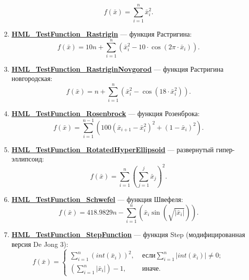 \begin{enumerate}
 \begin{equation}
 f\left( \bar{x}\right) = \sum_{i=1}^{n}\bar{x}_i^2.
 \end{equation}
 \item \hyperref[TestFunctions:section:HML_TestFunction_Rastrigin]{\textbf{HML\_TestFunction\_Rastrigin}} --- функция Растригина:
 \begin{equation}
 f\left( \bar{x}\right) = 10n+\sum_{i=1}^{n}\left( \bar{x}_i^2-10\cdot\cos\left( 2\pi\cdot \bar{x}_i\right) \right).
 \end{equation}
 \item \hyperref[TestFunctions:section:HML_TestFunction_RastriginNovgorod]{\textbf{HML\_TestFunction\_RastriginNovgorod}} --- функция Растригина новгородская:
 \begin{equation}
 f\left( \bar{x}\right) = n+\sum_{i=1}^{n}\left( \bar{x}_i^2-\cos\left(18\cdot \bar{x}_i^2\right) \right).
 \end{equation}
 \item \hyperref[TestFunctions:section:HML_TestFunction_Rosenbrock]{\textbf{HML\_TestFunction\_Rosenbrock}} --- функция Розенброка:
 \begin{equation}
 f\left( \bar{x}\right) = \sum_{i=1}^{n-1} \left( 100{\left( \bar{x}_{i+1}-\bar{x}_i^2\right)}^2+{\left( 1-\bar{x}_i\right) }^2 \right).
 \end{equation}
 \item \hyperref[TestFunctions:section:HML_TestFunction_RotatedHyperEllipsoid]{\textbf{HML\_TestFunction\_RotatedHyperEllipsoid}} --- развернутый гипер-эллипсоид:
 \begin{equation}
 f\left( \bar{x}\right) = \sum_{i=1}^{n}\left( \sum_{j=1}^{j}\bar{x}_j\right) ^2.
 \end{equation}
 \item \hyperref[TestFunctions:section:HML_TestFunction_Schwefel]{\textbf{HML\_TestFunction\_Schwefel}} --- функция Швефеля:
 \begin{equation}
 f\left( \bar{x}\right) = 418.9829 n-\sum_{i=1}^{n}\left( \bar{x}_i\sin\left( \sqrt{\left| \bar{x}_i\right|}\right)  \right).
 \end{equation}
 \item \hyperref[TestFunctions:section:HML_TestFunction_StepFunction]{\textbf{HML\_TestFunction\_StepFunction}} --- функция Step (модифицированная версия De Jong 3):
 \begin{equation}
 f\left( \bar{x}\right) =\left\lbrace \begin{aligned}
 \sum_{i=1}^{n} \left( int\left( \bar{x}_{i}\right)  \right)^2,& \text{ если} \sum_{i=1}^{n} \left| int\left( \bar{x}_{i}\right)\right| \neq 0 ;\\ \left( \sum_{i=1}^{n} \left| \bar{x}_{i}\right|\right) -1 ,& \text{ иначе}.

\end{aligned}
\end{equation}
\end{enumerate}
